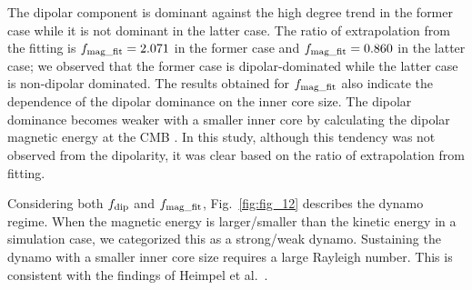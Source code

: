 The dipolar component is dominant against the high degree trend in the former case while it is not dominant in the latter case. 
The ratio of extrapolation from the fitting is $f_{\rm mag\_fit} = 2.071$ in the former case and $f_{\rm mag\_fit} = 0.860$ in the latter case; we observed that the former case is dipolar-dominated while the latter case is non-dipolar dominated. 
The results obtained for $f_{\rm mag\_fit}$  also indicate the dependence of the dipolar dominance on the inner core size. 
The dipolar dominance becomes weaker with a smaller inner core by calculating the dipolar magnetic energy at the CMB \cite{Heimpel:2005}. 
In this study, although this tendency was not observed from the dipolarity, it was clear based on the ratio of extrapolation from fitting.


Considering both $f_{\rm dip}$ and $f_{\rm mag\_fit}$, Fig.~{\color{red}\ref{fig:fig_12}
} describes the dynamo regime. 
When the magnetic energy is larger/smaller than the kinetic energy in a simulation case, we categorized this as a strong/weak dynamo. 
Sustaining the dynamo with a smaller inner core size requires a large Rayleigh number. 
This is consistent with the findings of Heimpel et al.\ . 

